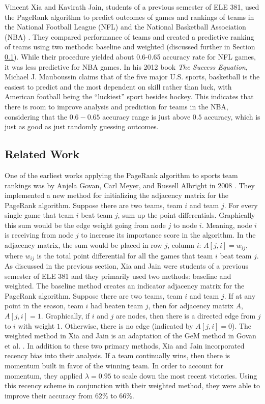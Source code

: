 \documentclass[12pt]{article}%
\begin{document}
\null\quad\quad Vincent Xia and Kavirath Jain, students of a previous semester of ELE 381, used the PageRank algorithm to predict outcomes of games and rankings of teams in the National Football League (NFL) and the National Basketball Association (NBA) \cite{XJ}. They compared performance of teams and created a predictive ranking of teams using two methods: baseline and weighted (discussed further in Section \ref{sec:relatedwork}). While their procedure yielded about 0.6-0.65 accuracy rate for NFL games, it was less predictive for NBA games. In his 2012 book \textit{The Success Equation}, Michael J. Mauboussin \cite{nbapredictable} claims that of the five major U.S. sports, basketball is the easiest to predict and the most dependent on skill rather than luck, with American football being the ``luckiest'' sport besides hockey. This indicates that there is room to improve analysis and prediction for teams in the NBA, considering that the $0.6-0.65$ accuracy range is just above $0.5$ accuracy, which is just as good as just randomly guessing outcomes.
\subsection{Related Work}
\label{sec:relatedwork}
\null\quad\quad One of the earliest works applying the PageRank algorithm to sports team rankings was by Anjela Govan, Carl Meyer, and Russell Albright in 2008 \cite{Govan}. They implemented a new method for initializing the adjacency matrix for the PageRank algorithm. Suppose there are two teams, team $i$ and team $j$. For every single game that team $i$ beat team $j$, sum up the point differentials. Graphically this sum would be the edge weight going from node $j$ to node $i$. Meaning, node $i$ is receiving from node $j$ to increase its importance score in the algorithm. In the adjacency matrix, the sum would be placed in row $j$, column $i$: $A[j,i]=w_{ij}$, where $w_{ij}$ is the total point differential for all the games that team $i$ beat team $j$. \\
\null\quad\quad As discussed in the previous section, Xia and Jain were students of a previous semester of ELE 381 and they primarily used two methods: baseline and weighted. The baseline method creates an indicator adjacency matrix for the PageRank algorithm. Suppose there are two teams, team $i$ and team $j$. If at any point in the season, team $i$ had beaten team $j$, then for adjacency matrix $A$, $A[j,i]=1$. Graphically, if $i$ and $j$ are nodes, then there is a directed edge from $j$ to $i$ with weight $1$. Otherwise, there is no edge (indicated by $A[j,i]=0$). The weighted method in Xia and Jain is an adaptation of the GeM method in Govan et al. \cite{Govan}. In addition to these two primary methods, Xia and Jain incorporated recency bias into their analysis. If a team continually wins, then there is momentum built in favor of the winning team. In order to account for momentum, they applied $\lambda=0.95$ \cite{XJ} to scale down the most recent victories. Using this recency scheme in conjunction with their weighted method, they were able to improve their accuracy from $62\%$ to $66\%$. 
\end{document}
